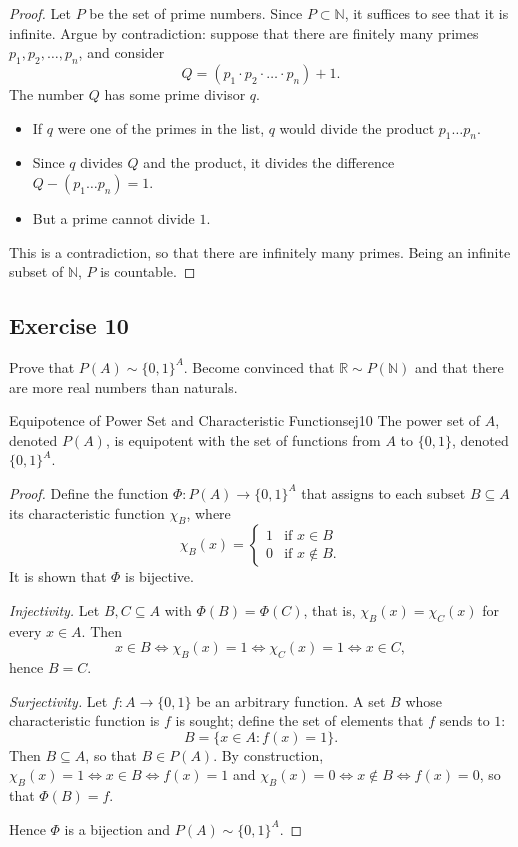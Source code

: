 \documentclass[11pt, a4paper]{article}
\begin{document}
\begin{proof}
Let $P$ be the set of prime numbers. Since $P \subset \mathbb{N}$, it suffices to see that it is infinite.
Argue by contradiction: suppose that there are finitely many primes $p_1, p_2, \dots, p_n$, and
consider
$$ Q = (p_1 \cdot p_2 \cdot \dots \cdot p_n) + 1. $$
The number $Q$ has some prime divisor $q$.
\begin{itemize}
    \item If $q$ were one of the primes in the list, $q$ would divide the product $p_1 \dots p_n$.
    \item Since $q$ divides $Q$ and the product, it divides the difference $Q - (p_1 \dots p_n) = 1$.
    \item But a prime cannot divide $1$.
\end{itemize}
This is a contradiction, so that there are infinitely many primes. Being an infinite subset of
$\mathbb{N}$, $P$ is countable.
\end{proof}

\subsection*{Exercise 10}

Prove that $P(A) \sim \{0,1\}^{A}$. Become convinced that $\mathbb{R} \sim P(\mathbb{N})$ and that there are
more real numbers than naturals.

\begin{proposicion}{Equipotence of Power Set and Characteristic Functions}{ej10}
The power set of $A$, denoted $P(A)$, is equipotent with the set of functions from $A$ to
$\{0,1\}$, denoted $\{0,1\}^A$.
\end{proposicion}

\begin{proof}
Define the function $\Phi: P(A) \to \{0,1\}^A$ that assigns to each subset $B \subseteq A$ its
characteristic function $\chi_B$, where
$$ \chi_B(x) = \begin{cases} 1 & \text{if } x \in B \\ 0 & \text{if } x \notin B. \end{cases} $$
It is shown that $\Phi$ is bijective.

\textit{Injectivity.} Let $B, C \subseteq A$ with $\Phi(B) = \Phi(C)$, that is,
$\chi_B(x) = \chi_C(x)$ for every $x \in A$. Then
$$ x \in B \iff \chi_B(x) = 1 \iff \chi_C(x) = 1 \iff x \in C, $$
hence $B = C$.

\textit{Surjectivity.} Let $f: A \to \{0,1\}$ be an arbitrary function. A set $B$ whose characteristic
function is $f$ is sought; define the set of elements that $f$ sends to $1$:
$$ B = \{ x \in A : f(x) = 1 \}. $$
Then $B \subseteq A$, so that $B \in P(A)$. By construction,
$\chi_B(x) = 1 \iff x \in B \iff f(x) = 1$ and $\chi_B(x) = 0 \iff x \notin B \iff f(x) = 0$, so that
$\Phi(B) = f$.

Hence $\Phi$ is a bijection and $P(A) \sim \{0,1\}^A$.
\end{proof}
\end{document}
